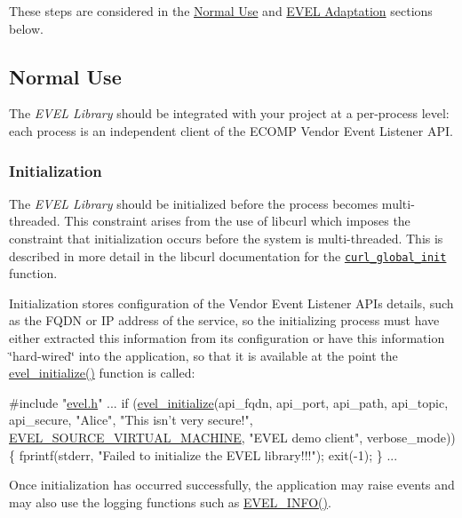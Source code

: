 These steps are considered in the \hyperlink{quickstart_qs_normal_use}{Normal Use} and \hyperlink{quickstart_qs_adaptation}{E\+V\+EL Adaptation} sections below.\hypertarget{quickstart_qs_normal_use}{}\subsection{Normal Use}\label{quickstart_qs_normal_use}
The {\itshape E\+V\+EL Library} should be integrated with your project at a per-\/process level\+: each process is an independent client of the E\+C\+O\+MP Vendor Event Listener A\+PI.\hypertarget{quickstart_qs_initialize}{}\subsubsection{Initialization}\label{quickstart_qs_initialize}
The {\itshape E\+V\+EL Library} should be initialized before the process becomes multi-\/threaded. This constraint arises from the use of libcurl which imposes the constraint that initialization occurs before the system is multi-\/threaded. This is described in more detail in the libcurl documentation for the \href{https://curl.haxx.se/libcurl/c/curl_global_init.html}{\tt curl\+\_\+global\+\_\+init} function.

Initialization stores configuration of the Vendor Event Listener A\+PI\textquotesingle{}s details, such as the F\+Q\+DN or IP address of the service, so the initializing process must have either extracted this information from its configuration or have this information \char`\"{}hard-\/wired\char`\"{} into the application, so that it is available at the point the {\ttfamily \hyperlink{evel_8c_a059033f948f5bf406fedb4a7ef1966da}{evel\+\_\+initialize()}} function is called\+:


\begin{DoxyCode}
\textcolor{preprocessor}{#include "\hyperlink{evel_8h}{evel.h}"}
...
if (\hyperlink{evel_8c_a059033f948f5bf406fedb4a7ef1966da}{evel\_initialize}(api\_fqdn,
                    api\_port,
                    api\_path,
                    api\_topic,
                    api\_secure,
                    \textcolor{stringliteral}{"Alice"},
                    \textcolor{stringliteral}{"This isn't very secure!"},
                    \hyperlink{evel_8h_a304eae0d024005dc4c7031bdd774d64aa4fbe43c85c55ae14048a2dc7fc5bfcc8}{EVEL\_SOURCE\_VIRTUAL\_MACHINE},
                    \textcolor{stringliteral}{"EVEL demo client"},
                    verbose\_mode))
\{
  fprintf(stderr, \textcolor{stringliteral}{"Failed to initialize the EVEL library!!!"});
  exit(-1);
\}
...
\end{DoxyCode}
 Once initialization has occurred successfully, the application may raise events and may also use the logging functions such as \hyperlink{evel_8h_aeadebff1d4d408323d3992a2771510c7}{E\+V\+E\+L\+\_\+\+I\+N\+F\+O()}.

